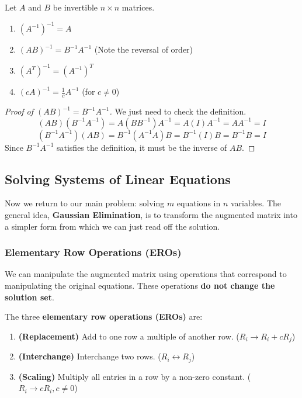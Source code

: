 \begin{property}
Let $A$ and $B$ be invertible $n \times n$ matrices.
\begin{enumerate}
    \item $(A^{-1})^{-1} = A$
    \item $(AB)^{-1} = B^{-1} A^{-1}$ (Note the reversal of order)
    \item $(A^T)^{-1} = (A^{-1})^T$
    \item $(cA)^{-1} = \frac{1}{c} A^{-1}$ (for $c \neq 0$)
\end{enumerate}
\end{property}
\begin{proof}[Proof of $(AB)^{-1} = B^{-1} A^{-1}$]
We just need to check the definition.
\[ (AB)(B^{-1} A^{-1}) = A (B B^{-1}) A^{-1} = A (I) A^{-1} = A A^{-1} = I \]
\[ (B^{-1} A^{-1})(AB) = B^{-1} (A^{-1} A) B = B^{-1} (I) B = B^{-1} B = I \]
Since $B^{-1} A^{-1}$ satisfies the definition, it must be the inverse of $AB$.
\end{proof}

\subsection{Solving Systems of Linear Equations}

Now we return to our main problem: solving $m$ equations in $n$ variables.
The general idea, \textbf{Gaussian Elimination}, is to transform the augmented matrix into a simpler form from which we can just read off the solution.

\subsubsection{Elementary Row Operations (EROs)}

We can manipulate the augmented matrix using operations that correspond to manipulating the original equations. These operations \textbf{do not change the solution set}.

\begin{definition}
The three \textbf{elementary row operations (EROs)} are:
\begin{enumerate}
    \item \textbf{(Replacement)} Add to one row a multiple of another row. ($R_i \to R_i + cR_j$)
    \item \textbf{(Interchange)} Interchange two rows. ($R_i \leftrightarrow R_j$)
    \item \textbf{(Scaling)} Multiply all entries in a row by a non-zero constant. ($R_i \to cR_i, c \neq 0$)
\end{enumerate}
\end{definition}

